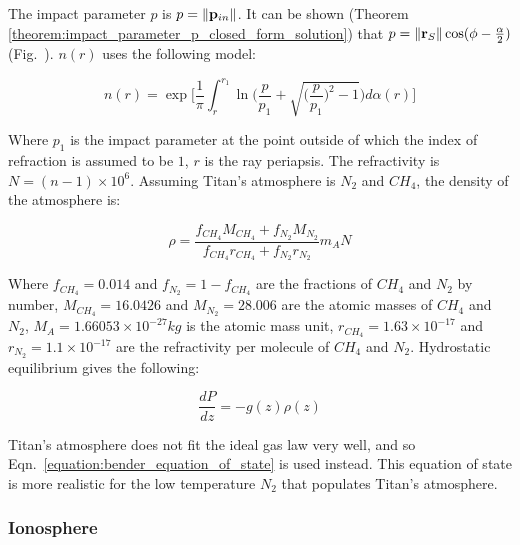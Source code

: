 \documentclass[oneside]{book}
\theoremstyle{mystyle}
\DeclarePairedDelimiter\norm{\lVert}{\rVert}
\begin{document}
\noindent The impact parameter $p$ is $p=\norm{\mathbf{p}_{in}}$. It can be shown (Theorem \ref{theorem:impact_parameter_p_closed_form_solution}) that $p = \norm{\mathbf{r}_{S}}\cos(\phi - \frac{\alpha}{2})$ (Fig.~). $n(r)$ uses the following model:

\begin{equation}
n(r) = \exp\bigg[\frac{1}{\pi}\int_{r}^{r_1}\ln\bigg(\frac{p}{p_1}+\sqrt{\big(\frac{p}{p_1}\big)^2 - 1}\bigg)d\alpha(r)\bigg]
\end{equation}

\noindent Where $p_1$ is the impact parameter at the point outside of which the index of refraction is assumed to be $1$, $r$ is the \gls{ray periapsis}. The refractivity is $N=(n-1)\times 10^6$. Assuming Titan's atmosphere is $N_2$ and $CH_4$, the density of the atmosphere is:

\begin{equation}
\rho = \frac{f_{CH_4}M_{CH_4}+f_{N_2}M_{N_2}}{f_{CH_4}r_{CH_4}+f_{N_2}r_{N_2}}m_{A}N
\end{equation}

\noindent Where $f_{CH_4} = 0.014$ and $f_{N_2} = 1-f_{CH_4}$ are the fractions of $CH_{4}$ and $N_{2}$ by number, $M_{CH_4} = 16.0426$ and $M_{N_2} = 28.006$ are the atomic masses of $CH_{4}$ and $N_2$, $M_{A} = 1.66053\times 10^{-27}kg$ is the atomic mass unit, $r_{CH_4} = 1.63\times 10^{-17}$ and $r_{N_2} = 1.1\times 10^{-17}$ are the refractivity per molecule of $CH_{4}$ and $N_2$. Hydrostatic equilibrium gives the following:

\begin{equation}
\label{equation:bender_equation_of_state}
\frac{dP}{dz} = -g(z)\rho(z)
\end{equation}

\noindent Titan's atmosphere does not fit the ideal gas law very well, and so Eqn.~\ref{equation:bender_equation_of_state} is used instead. This equation of state is more realistic for the low temperature $N_2$ that populates Titan's atmosphere. 

\subsubsection{\footnotesize Ionosphere}
\end{document}

